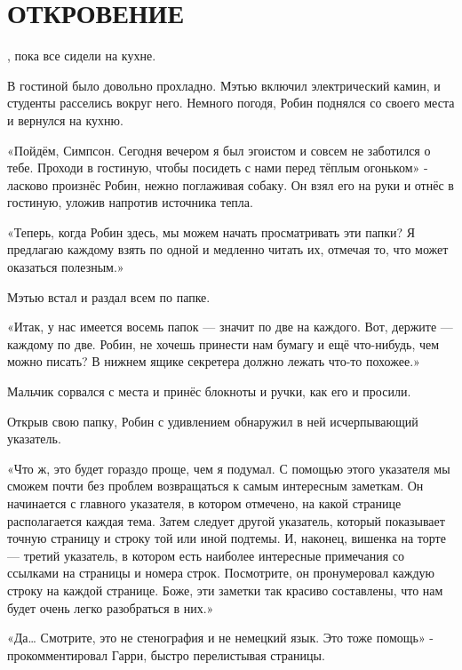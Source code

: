 \documentclass[a4paper,12pt]{book}
\begin{document}
\chapter{ОТКРОВЕНИЕ}
\noindent{}, пока все сидели на кухне.\\
\par
В гостиной было довольно прохладно. Мэтью включил электрический камин, и студенты расселись вокруг него. Немного погодя, Робин поднялся со своего места и вернулся на кухню.
\par
«Пойдём, Симпсон. Сегодня вечером я был эгоистом и совсем не заботился о тебе. Проходи в гостиную, чтобы посидеть с нами перед тёплым огоньком» - ласково произнёс Робин, нежно поглаживая собаку. Он взял его на руки и отнёс в гостиную, уложив напротив источника тепла.\\
\par
«Теперь, когда Робин здесь, мы можем начать просматривать эти папки? Я предлагаю каждому взять по одной и медленно читать их, отмечая то, что может оказаться полезным.»
\par
Мэтью встал и раздал всем по папке.
\par
«Итак, у нас имеется восемь папок — значит по две на каждого. Вот, держите — каждому по две. Робин, не хочешь принести нам бумагу и ещё что-нибудь, чем можно писать? В нижнем ящике секретера должно лежать что-то похожее.»
\par
Мальчик сорвался с места и принёс блокноты и ручки, как его и просили.
\par
Открыв свою папку, Робин с удивлением обнаружил в ней исчерпывающий указатель.
\par
«Что ж, это будет гораздо проще, чем я подумал. С помощью этого указателя мы сможем почти без проблем возвращаться к самым интересным заметкам. Он начинается с главного указателя, в котором отмечено, на какой странице располагается каждая тема. Затем следует другой указатель, который показывает точную страницу и строку той или иной подтемы. И, наконец, вишенка на торте — третий указатель, в котором есть наиболее интересные примечания со ссылками на страницы и номера строк. Посмотрите, он пронумеровал каждую строку на каждой странице. Боже, эти заметки так красиво составлены, что нам будет очень легко разобраться в них.»
\par
«Да… Смотрите, это не стенография и не немецкий язык. Это тоже помощь» - прокомментировал Гарри, быстро перелистывая страницы.\\
\end{document}
